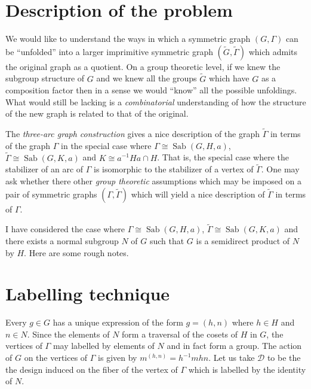 \documentclass[12pt]{amsart}
\theoremstyle{plain}
\theoremstyle{definition}
\theoremstyle{remark}
\DeclareMathOperator{\sab}{Sab}
\newcommand{\cD}{\mathcal{D}}
\begin{document}
\section{Description of the problem}
We would like to understand the ways in which a symmetric graph
$(G, \Gamma)$ can be ``unfolded'' into a larger imprimitive symmetric graph
$(\widetilde{G}, \widetilde{\Gamma})$ which admits the original graph as a quotient.
On a group theoretic level, if we knew the subgroup structure of $G$
and we knew all the groups $\widetilde{G}$ which have $G$ as a
composition factor then in a sense we would ``know'' all the possible unfoldings.
What would still be lacking is a {\it combinatorial} understanding
of how the structure of the new graph is related to that of the original.

The {\it three-arc graph construction} gives a nice description
of the graph $\widetilde{\Gamma}$ in terms of the graph $\Gamma$
in the special case where $\Gamma \cong \sab(G,H,a)$,
$\widetilde{\Gamma} \cong \sab(G,K,a)$ and $K \cong a^{-1}Ha \cap H$.
That is, the special case where the stabilizer of an arc of $\Gamma$
is isomorphic to the stabilizer of a vertex of $\widetilde{\Gamma}$.
One may ask whether there other {\it group theoretic} assumptions
which may be imposed on a pair of symmetric graphs $(\Gamma, \widetilde{\Gamma})$
which will yield a nice description of $\widetilde{\Gamma}$ in terms of $\Gamma$.

I have considered the case where $\Gamma \cong \sab(G,H,a)$,
$\widetilde{\Gamma} \cong \sab(G,K,a)$ 
and there exists a normal subgroup $N$ of $G$ such that
$G$ is a semidirect product of $N$ by $H$.
Here are some rough notes.

\section{Labelling technique}

Every $g \in G$ has a unique expression of the form $g = (h,n)$
where $h \in H$ and $n \in N$.
Since the elements of $N$ form a traversal of the cosets of $H$ in $G$,
the vertices of $\Gamma$ may labelled by elements of $N$
and in fact form a group.
The action of $G$ on the vertices of $\Gamma$ is given by
$m^{(h,n)} = h^{-1}mhn$.
Let us take $\cD$ to be the the design induced on the fiber of the
vertex of $\Gamma$ which is labelled by the identity of $N$.
\end{document}
